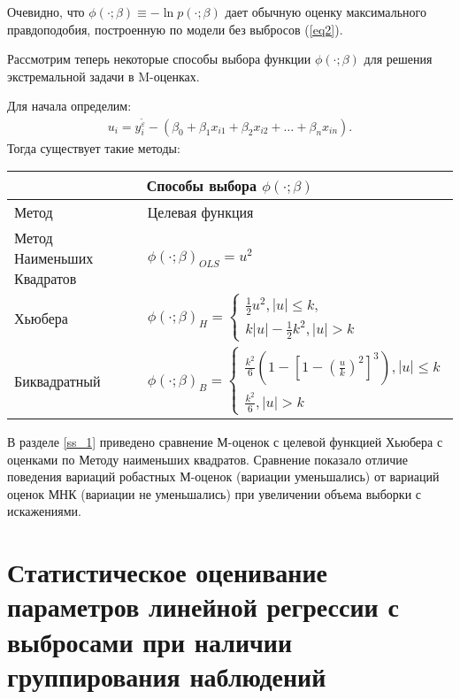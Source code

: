 Очевидно, что $\phi(\cdot;\beta)\equiv - \ln{p(\cdot;\beta)}$ дает обычную оценку максимального правдоподобия, построенную по модели без выбросов (\ref{eq2}).

Рассмотрим теперь некоторые способы выбора функции $\phi(\cdot;\beta)$ для решения экстремальной задачи в M-оценках.

Для начала определим:
\begin{eqnarray}
    u_i=y_i^{\widetilde{\varepsilon}}-(\beta_0+\beta_1 x_{i1}+\beta_2 x_{i2}+\dots+\beta_n x_{in}).
\end{eqnarray}
Тогда существует такие методы\cite{RobustRegression}:\hfill\break
\begin{center}
\begin{tabular}{ |p{3cm}|p{10cm} | }
    \hline
    \multicolumn{2}{|c|}{Способы выбора $\phi(\cdot;\beta)$} \\
    \hline
    Метод& Целевая функция\\
    \hline
    Метод Наименьших Квадратов&$\phi(\cdot;\beta)_{OLS}=u^2$\\
    \hline
    Хьюбера&$\phi(\cdot;\beta)_{H}=
        \begin{cases}
            \frac{1}{2}u^2, |u|\leq k,\\
            k|u|-\frac{1}{2}k^2, |u|>k
        \end{cases}$\\
    \hline
    Биквадратный& $\phi(\cdot;\beta)_{B}=
    \begin{cases}
        \frac{k^2}{6}(1-[1-(\frac{u}{k})^2]^3), |u|\leq k\\
        \frac{k^2}{6}, |u|>k
    \end{cases}$\\
    \hline
\end{tabular}
\end{center}

В разделе \ref{ss_1} приведено сравнение М-оценок с целевой функцией Хьюбера с оценками по Методу наименьших квадратов.
Сравнение показало отличие поведения вариаций робастных М-оценок (вариации уменьшались) от вариаций оценок МНК (вариации не уменьшались) при увеличении объема выборки с искажениями.

\newpage

\newpage
\section{Статистическое оценивание параметров линейной регрессии с выбросами при наличии группирования наблюдений}
